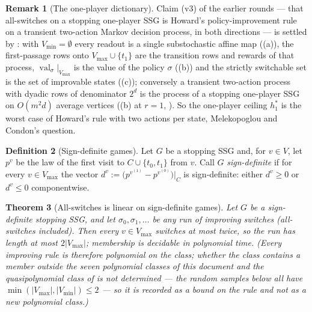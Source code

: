 \documentclass[11pt]{article}
\theoremstyle{plain}
\newtheorem{theorem}{Theorem}[section]
\theoremstyle{definition}
\newtheorem{definition}[theorem]{Definition}
\newtheorem{remark}[theorem]{Remark}
\DeclareMathOperator{\val}{val}
\newcommand{\Vmax}{V_{\max}}
\newcommand{\Vmin}{V_{\min}}
\begin{document}
\begin{remark}[The one-player dictionary]\label{rem:oneplayer-dictionary}
Claim (v3) of the earlier rounds --- that all-switches on a stopping
one-player SSG is Howard's policy-improvement rule on a transient
two-action Markov decision process, in both directions --- is settled by
: with $\Vmin=\emptyset$ every readout is a single
substochastic affine map ((a)), the first-passage rows
onto $\Vmax\cup\{t_1\}$ are the transition rows and rewards of that
process, $\val_\sigma|_{\Vmax}$ is the value of the policy $\sigma$
((b)) and the strictly switchable set is the set of
improvable states ((c)); conversely a transient
two-action process with dyadic rows of denominator $2^{d}$ is the process
of a stopping one-player SSG on $O(m^{2}d)$ average vertices
((b) at $r=1$, ). So the
one-player ceiling $h^{\ast}_{1}$ is the worst case of Howard's rule with
two actions per state, Melekopoglou and Condon's question.
\end{remark}

\begin{definition}[Sign-definite games]\label{def:signdef}
Let $G$ be a stopping SSG and, for $v\in V$, let $p^{v}$ be the law of the first visit
to $C\cup\{t_0,t_1\}$ from $v$. Call $G$ \emph{sign-definite} if for every
$v\in\Vmax$ the vector $d^{v}:=\bigl(p^{v^{(1)}}-p^{v^{(0)}}\bigr)\big|_{C}$ is
sign-definite: either $d^{v}\ge0$ or $d^{v}\le0$ componentwise.
\end{definition}

\begin{theorem}[All-switches is linear on sign-definite games]\label{thm:signdef}
Let $G$ be a sign-definite stopping SSG, and let $\sigma_0,\sigma_1,\dots$ be any run
of improving switches (all-switches included). Then every $v\in\Vmax$ switches at most
twice, so the run has length at most $2|\Vmax|$; membership is decidable in
polynomial time. (Every improving rule is therefore polynomial on the class;
whether the class contains a member outside the seven polynomial classes
of this document and the quasipolynomial class of  is not
determined --- the random samples below all have
$\min(|\Vmax|,|\Vmin|)\le2$ --- so it is recorded as a bound on the rule and
not as a new polynomial class.)
\end{theorem}
\end{document}

